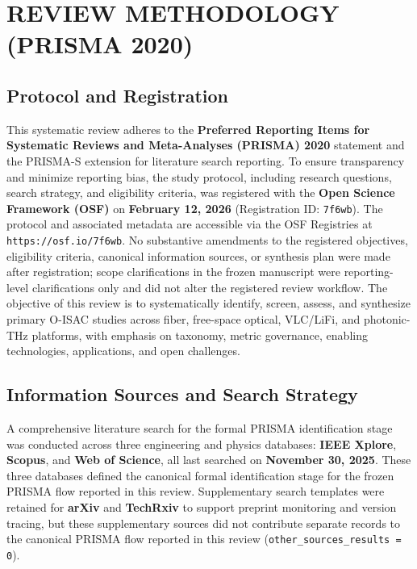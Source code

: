 \documentclass[letterpaper,journal]{IEEEtran}
\begin{document}
\section{REVIEW METHODOLOGY (PRISMA 2020)}


\subsection{Protocol and Registration}
This systematic review adheres to the \textbf{Preferred Reporting Items for Systematic Reviews and Meta-Analyses (PRISMA) 2020} statement and the PRISMA-S extension for literature search reporting. To ensure transparency and minimize reporting bias, the study protocol, including research questions, search strategy, and eligibility criteria, was registered with the \textbf{Open Science Framework (OSF)} on \textbf{February 12, 2026} (Registration ID: \texttt{7f6wb}). The protocol and associated metadata are accessible via the OSF Registries at \texttt{https://osf.io/7f6wb}.
No substantive amendments to the registered objectives, eligibility criteria, canonical information sources, or synthesis plan were made after registration; scope clarifications in the frozen manuscript were reporting-level clarifications only and did not alter the registered review workflow.
The objective of this review is to systematically identify, screen, assess, and synthesize primary O-ISAC studies across fiber, free-space optical, VLC/LiFi, and photonic-THz platforms, with emphasis on taxonomy, metric governance, enabling technologies, applications, and open challenges.

\subsection{Information Sources and Search Strategy}
A comprehensive literature search for the formal PRISMA identification stage was conducted across three engineering and physics databases: \textbf{IEEE Xplore}, \textbf{Scopus}, and \textbf{Web of Science}, all last searched on \textbf{November 30, 2025}. These three databases defined the canonical formal identification stage for the frozen PRISMA flow reported in this review. Supplementary search templates were retained for \textbf{arXiv} and \textbf{TechRxiv} to support preprint monitoring and version tracing, but these supplementary sources did not contribute separate records to the canonical PRISMA flow reported in this review (\texttt{other\_sources\_results = 0}).
\end{document}
